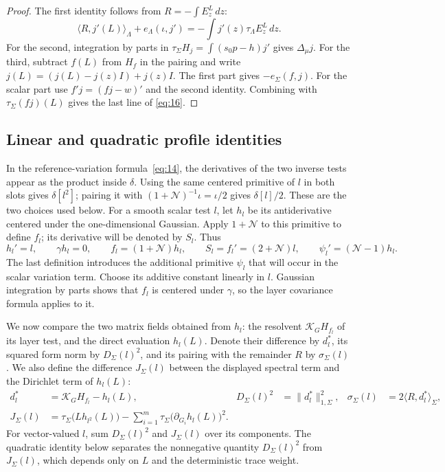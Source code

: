 \begin{proof}
The first identity follows from \(R=-\int E_z^L\,dz\):
\[
 \langle R,j'(L)\rangle_\Lambda+e_\Lambda(\iota,j')
     =-\int j'(z)\tau_\Lambda E_z^L\,dz.
\]
For the second, integration by parts in
\(\tau_\Sigma H_j=\int(s_0p-h)j'\) gives
\(\Delta_\mu j\).
For the third, subtract \(f(L)\) from \(H_f\) in the pairing and
write \(j(L)=(j(L)-j(z)I)+j(z)I\).
The first part gives \(-e_\Sigma(f,j)\). For the scalar part use
\(f'j=(fj-w)'\) and the second identity. Combining with
\(\tau_\Sigma(fj)(L)\) gives the last line of \eqref{eq:16}.
\end{proof}

\subsection{Linear and quadratic profile identities}

In the reference-variation formula~\eqref{eq:14}, the derivatives of
the two inverse tests appear as the product inside $\delta$.
Using the same centered primitive of $l$ in both slots gives
$\delta[l^2]$; pairing it with
$(1+\mathcal N)^{-1}\iota=\iota/2$ gives $\delta[l]/2$.
These are the two choices used below.
For a smooth scalar test $l$, let $h_l$ be its antiderivative
centered under the one-dimensional Gaussian. Apply $1+\mathcal N$
to this primitive to define $f_l$; its derivative will be denoted
by $S_l$. Thus
\[
 h_l'=l,\qquad \gamma h_l=0,\qquad
 f_l=(1+\mathcal N)h_l,\qquad S_l=f_l'=(2+\mathcal N)l,
 \qquad \psi_l'=(\mathcal N-1)h_l.
\]
The last definition introduces the additional primitive \(\psi_l\)
that will occur in the scalar variation term. Choose its additive
constant linearly in \(l\). Gaussian integration by parts shows that
\(f_l\) is centered under \(\gamma\), so the layer covariance formula
applies to it.

We now compare the two matrix fields obtained from \(h_l\): the
resolvent \(\mathcal K_GH_{f_l}\) of its layer test, and the direct
evaluation \(h_l(L)\). Denote their difference by \(d_l^*\), its
squared form norm by \(D_\Sigma(l)^2\), and its pairing with the
remainder \(R\) by \(\sigma_\Sigma(l)\). We also define the difference
\(J_\Sigma(l)\) between the displayed spectral term and the Dirichlet
term of \(h_l(L)\):
\[
 \begin{aligned}
 d_l^*&=\mathcal K_GH_{f_l}-h_l(L),&
 D_\Sigma(l)^2&=\|d_l^*\|_{1,\Sigma}^2,&
 \sigma_\Sigma(l)&=2\langle R,d_l^*\rangle_\Sigma,\\
 J_\Sigma(l)&=\tau_\Sigma\bigl(Lh_{l^2}(L)\bigr)
       -\sum_{i=1}^m\tau_\Sigma
                   \bigl(\partial_{G_i}h_l(L)\bigr)^2 .
 \end{aligned}
\]
For vector-valued \(l\), sum \(D_\Sigma(l)^2\) and \(J_\Sigma(l)\)
over its components.
The quadratic identity below separates the nonnegative quantity
\(D_\Sigma(l)^2\) from \(J_\Sigma(l)\), which depends only on \(L\)
and the deterministic trace weight.

